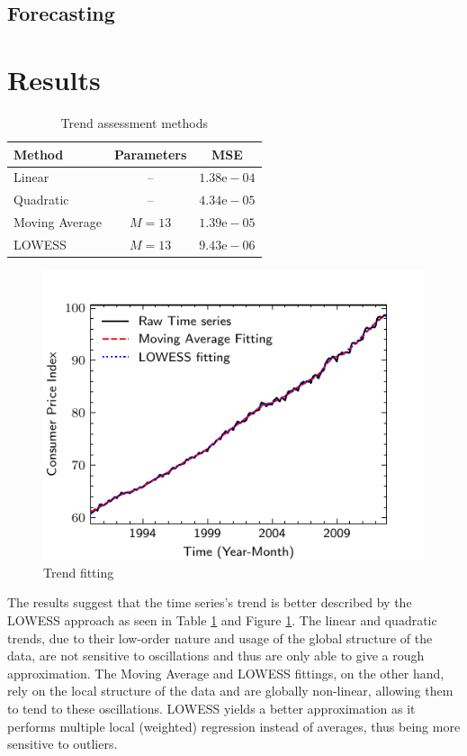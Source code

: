 \documentclass[conference]{IEEEtran}
\begin{document}
\subsection{Forecasting}

\section{Results}

\begin{table}[btp]
    \caption{Trend assessment methods}
    \centering
    \begin{tabular}{l|c|c}
         Method & Parameters & MSE \\
         \hline
         Linear & -- &  $1.38\text{e}-04$ \\
         Quadratic & -- & $4.34\text{e}-05$ \\
         Moving Average & $M=13$ & $1.39\text{e}-05$ \\
         LOWESS & $M=13$ & \cellcolor{green!25}$9.43\text{e}-06$ \\
    \end{tabular}
    \label{tab:trend}
\end{table}

\begin{figure}[hbtp]
    \centering
    \includegraphics{../figs/trend.pdf}
    \caption{Trend fitting}
    \label{fig:trend}
\end{figure}

The results suggest that the time series's trend is better described by the LOWESS approach as seen in Table \ref{fig:trend} and Figure \ref{fig:trend}. The linear and quadratic trends, due to their low-order nature and usage of the global structure of the data, are not sensitive to oscillations and thus are only able to give a rough approximation. The Moving Average and LOWESS fittings, on the other hand, rely on the local structure of the data and are globally non-linear, allowing them to tend to these oscillations. LOWESS yields a better approximation as it performs multiple local (weighted) regression instead of averages, thus being more sensitive to outliers.
\end{document}
